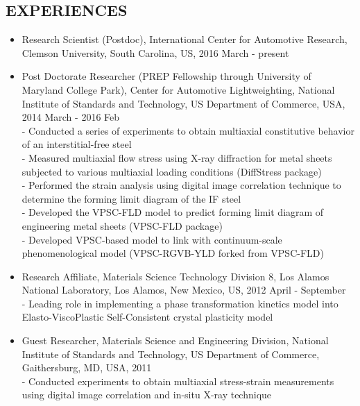 \documentclass{res}
\begin{document}
\begin{resume}
  \section{EXPERIENCES}
  \begin{itemize}
  \item Research Scientist (Postdoc), International Center for Automotive Research, Clemson University, South Carolina, US, 2016 March - present
  \item Post Doctorate Researcher (PREP Fellowship through University of Maryland College Park), Center for Automotive Lightweighting,
    National Institute of Standards and Technology, US Department of Commerce, USA, 2014 March - 2016 Feb\\
    - Conducted a series of experiments to obtain multiaxial constitutive behavior of an interstitial-free steel\\
    - Measured multiaxial flow stress using X-ray diffraction for metal sheets subjected to various multiaxial loading conditions (DiffStress package)\\
    - Performed the strain analysis using digital image correlation technique to determine the forming limit diagram of the IF steel\\
    - Developed the VPSC-FLD model to predict forming limit diagram of engineering metal sheets (VPSC-FLD package)\\
    - Developed VPSC-based model to link with continuum-scale phenomenological model (VPSC-RGVB-YLD forked from VPSC-FLD)
  \item Research Affiliate, Materials Science Technology Division 8, Los Alamos National Laboratory, Los Alamos, New Mexico, US, 2012 April - September \\
    - Leading role in implementing a phase transformation kinetics model into Elasto-ViscoPlastic Self-Consistent crystal plasticity model
  \item Guest Researcher, Materials Science and Engineering Division, National Institute of Standards and Technology, US Department of Commerce, Gaithersburg, MD, USA, 2011\\
    - Conducted experiments to obtain multiaxial stress-strain measurements using digital image correlation and in-situ X-ray technique
  \end{itemize}


\end{resume}
\end{document}
